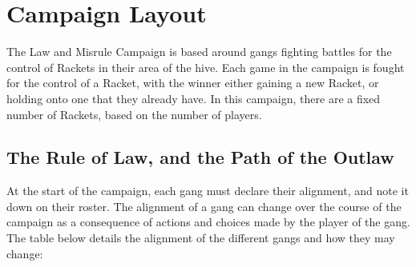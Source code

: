 \documentclass[a4paper]{article}
\begin{document}
	\section*{Campaign Layout}
	The Law and Misrule Campaign is based around gangs fighting battles for the control of Rackets in their area of the hive. Each game in the campaign is fought for the control of a Racket, with the winner either gaining a new Racket, or holding onto one that they already have. In this campaign, there are a fixed number of Rackets, based on the number of players.

	\subsection*{The Rule of Law, and the Path of the Outlaw}
	At the start of the campaign, each gang must declare their alignment, and note it down on their roster. The alignment of a gang can change over the course of the campaign as a consequence of actions and choices made by the player of the gang. The table below details the alignment of the different gangs and how they may change:
\end{document}
